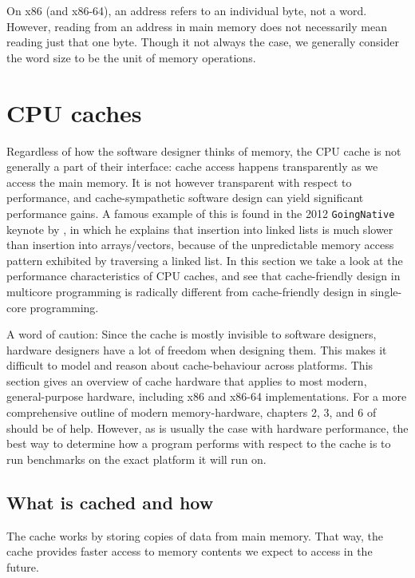 On x86 (and x86-64), an address refers to an individual byte, not a word. However,
reading from an address in main memory does not necessarily mean reading just
that one byte. Though it not always the case, we generally consider the word
size to be the unit of memory operations.

\section{CPU caches}
Regardless of how the software designer thinks of memory, the CPU cache is not
generally a part of their interface: cache access happens transparently as we
access the main memory. It is not however transparent with
respect to performance, and cache-sympathetic software design can yield
significant performance gains. A famous example of this is found in the 2012
\texttt{GoingNative} keynote by \citeauthor{stroustrup} \cite{stroustrup}, in
which he explains that insertion into linked lists is much slower than
insertion into arrays/vectors, because of the unpredictable memory access
pattern exhibited by traversing a linked list. In this section we take a look
at the performance characteristics of CPU caches, and see that cache-friendly
design in multicore programming is radically different from cache-friendly
design in single-core programming. 

A word of caution:
Since the cache is mostly invisible to software designers, hardware designers
have a lot of freedom when designing them. This makes it difficult to model and
reason about cache-behaviour across platforms. This section gives an overview
of cache hardware that applies to most modern, general-purpose hardware,
including x86 and x86-64 implementations. For a more comprehensive outline of
modern memory-hardware, chapters 2, 3, and 6 of
\cite{whatprogrammersshouldknow} should be of help. However, as is usually the
case with hardware performance, the best way to determine how a program
performs with respect to the cache is to run benchmarks on the exact platform
it will run on.

\subsection{What is cached and how} The cache works by storing copies
of data from main memory. That way, the cache provides faster access to
memory contents we expect to access in the future.

